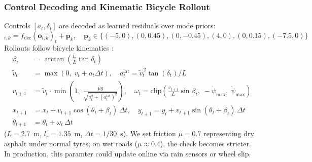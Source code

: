 \documentclass[preprint,12pt]{elsarticle}
\begin{document}
\subsubsection{Control Decoding and Kinematic Bicycle Rollout}
Controls $[a_t, \delta_t]$ are decoded as learned residuals over mode priors:
\begin{equation}
    [a_t, \delta_t]_{i,k} = f_{\text{dec}}(\mathbf{o}_{i,k})_t + \mathbf{p}_{k}, \quad
    \mathbf{p}_k \in \{(-5, 0), (0, 0.45), (0, -0.45), (4, 0), (0, 0.15), (-7.5, 0)\}
    \label{eq_prior}
\end{equation}
Rollouts follow bicycle kinematics \cite{kong2015kinematic}:
\begin{align}
    \beta_t &= \arctan\left(\frac{l_r}{L} \tan \delta_t\right) \label{eq_slip} \\
    \tilde{v}_{t} &= \max\left(0, \; v_t + a_t \Delta t\right), \quad a^{\text{lat}}_t = \tilde{v}_t^{\,2} \tan(\delta_t) / L \label{eq_v} \\
    v_{t+1} &= \tilde{v}_t \cdot \min\left(1, \; \frac{\mu g}{\sqrt{a_t^2 + (a^{\text{lat}}_t)^2}}\right), \quad
    \omega_t = \text{clip}\left(\frac{v_{t+1}}{L} \sin \beta_t, \; -\dot{\psi}_{\max}, \; \dot{\psi}_{\max}\right) \label{eq_yaw} \\
    x_{t+1} &= x_t + v_{t+1} \cos(\theta_t + \beta_t) \, \Delta t, \quad
    y_{t+1} = y_t + v_{t+1} \sin(\theta_t + \beta_t) \, \Delta t \label{eq_xy} \\
    \theta_{t+1} &= \theta_t + \omega_t \, \Delta t \label{eq_theta}
\end{align}
($L=2.7$~m, $l_r=1.35$~m, $\Delta t=1/30$~s). We set friction $\mu = 0.7$ representing dry asphalt under normal tyres; on wet roads ($\mu \approx 0.4$), the check becomes stricter. In production, this paramter could update online via rain sensors or wheel slip.
\end{document}
